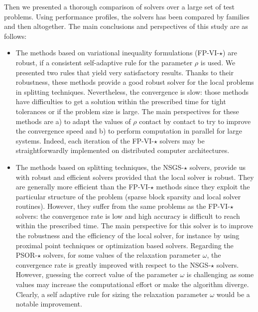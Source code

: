Then we presented a thorough comparison of solvers over a large set of test problems. Using performance profiles, the solvers has been compared by families and then altogether. The main conclusions and perspectives of this study are as follows:
\begin{itemize}
\item The methods based on variational inequality formulations ({\sf FP-VI-$\star$}) are robust, if a consistent self-adaptive rule for the parameter $\rho$ is used. We presented two rules that yield very satisfactory results. Thanks to their robustness, these methods provide a good robust solver for the local problems in splitting techniques. Nevertheless, the convergence is slow: those methods have difficulties to get a solution within the prescribed time for tight tolerances or if the problem size is large. The main perspectives for these methods are a) to adapt the values of $\rho$ contact by contact to try to improve the convergence speed and b) to perform computation in parallel for large systems. Indeed, each iteration of the {\sf FP-VI-$\star$} solvers may be straightforwardly implemented on distributed computer architectures.

\item The methods based on splitting techniques, the {\sf NSGS-$\star$} solvers, provide us with robust and efficient solvers provided that the local solver is robust. They are generally more efficient than the {\sf FP-VI-$\star$} methods since they exploit the particular structure of the problem (sparse block sparsity and local solver routines). However, they suffer from the same problems as the  {\sf FP-VI-$\star$} solvers: the convergence rate is low and high accuracy is difficult to reach within the prescribed time. The main perspective for this solver is to improve the robustness and the efficiency of the local solver, for instance by using proximal point techniques or optimization based solvers. Regarding the {\sf PSOR-$\star$} solvers, for some values of the relaxation parameter $\omega$, the convergence rate is greatly improved with respect to the {\sf NSGS-$\star$} solvers. However, guessing the correct value of the parameter $\omega$ is challenging as some values may increase the computational effort or make the algorithm diverge. Clearly, a self adaptive rule for sizing the relaxation parameter $\omega$ would be a notable improvement.


\end{itemize}
